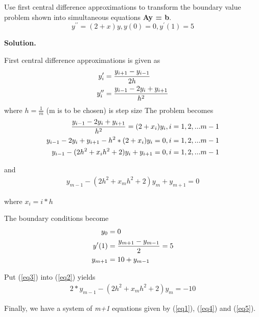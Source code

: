 \begin{exercise}{3} %
Use first central difference approximations to transform the boundary value problem shown into simultaneous equations \textbf{Ay = b}.
$$y^{\prime\prime} = (2 + x)y, y(0) = 0, y^\prime(1) = 5$$

\textbf{Solution.}

First central difference approximations is given as
\begin{align}
y^\prime_i &= \frac{y_{i+1}-y_{i-1}}{2h} \notag \\
y^{\prime\prime}_i &= \frac{y_{i-1}-2y_i+y_{i+1}}{h^2} \notag
\end{align}
where $h=\frac{1}{m}$ (m is to be chosen) is step size
The problem becomes
\begin{align}
\frac{y_{i-1}-2y_i+y_{i+1}}{h^2} = (2+x_i)y_i, i=1,2,...m-1\notag \\
y_{i-1}-2y_i+y_{i+1} - {h^2}*(2+x_i)y_i = 0, i=1,2,...m-1\notag \\
y_{i-1} - (2h^2+x_ih^2+2)y_i+y_{i+1} = 0 , i=1,2,...m-1 \label{eq1} 
\end{align}

and  
\begin{align}
y_{m-1} - (2h^2+x_mh^2+2)y_m+y_{m+1} = 0 \label{eq2}
\end{align}

where $x_i = i*h$

The boundary conditions become
\begin{align}
y_0 &= 0 \label{eq4} \\ 
y^\prime(1) &= \frac{y_{m+1}-y_{m-1}}{2} = 5\notag \\
y_{m+1}&=10+y_{m-1} \label{eq3}
\end{align}

Put (\ref{eq3}) into (\ref{eq2}) yields
\begin{align}
2*y_{m-1} - (2h^2+x_mh^2+2)y_m= -10 \label{eq5}
\end{align}

Finally, we have a system of \textit{m+1} equations given by (\ref{eq1}), (\ref{eq4}) and (\ref{eq5}).

\end{exercise}


